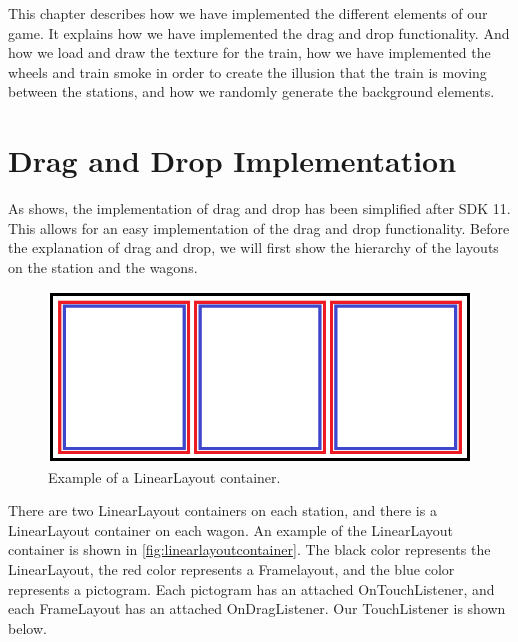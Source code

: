 This chapter describes how we have implemented the different elements of our game. It explains how we have implemented the drag and drop functionality. And how we load and draw the texture for the train, how we have implemented the wheels and train smoke in order to create the illusion that the train is moving between the stations, and how we randomly generate the background elements.

\section{Drag and Drop Implementation} \label{sec:implementationdraganddrop}
As  shows, the implementation of drag and drop has been simplified after SDK 11. This allows for an easy implementation of the drag and drop functionality. Before the explanation of drag and drop, we will first show the hierarchy of the layouts on the station and the wagons.
\begin{figure}[H]
\centering
\includegraphics[width=0.9\linewidth]{img/layoutexample.png}%
\caption{Example of a LinearLayout container.}
\label{fig:linearlayoutcontainer}
\end{figure}
There are two LinearLayout containers on each station, and there is a LinearLayout container on each wagon. An example of the LinearLayout container is shown in \autoref{fig:linearlayoutcontainer}. The black color represents the LinearLayout, the red color represents a Framelayout, and the blue color represents a pictogram. Each pictogram has an attached OnTouchListener, and each FrameLayout has an attached OnDragListener. Our TouchListener is shown below.


